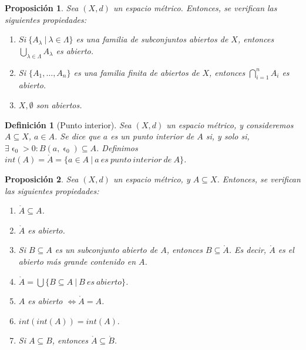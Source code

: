 \documentclass[11pt, a4paper, titlepage]{article}
\let\epsilon\upvarepsilon
\theoremstyle{theorem-style}
\newtheorem*{nprop}{Proposición}
\theoremstyle{definition-style}
\newtheorem*{ndef}{Definición}
\theoremstyle{remark-style}
\theoremstyle{example-style}
\newenvironment{nlist}
{\begin{enumerate}
\renewcommand\labelenumi{(\emph{\roman{enumi})}}}
{\end{enumerate}}
\begin{document}
\begin{nprop}
Sea $(X,d)$ un espacio métrico. Entonces, se verifican las siguientes propiedades:

\begin{nlist}
\item $Si\ \{A_\lambda \ | \ \lambda \in \Lambda \}$ es una familia de subconjuntos abiertos de $X$, entonces $\displaystyle \bigcup_{\lambda \in \Lambda} A_\lambda$ es abierto.

\item Si $\{A_1,\dots, A_n\}$ es una familia finita de abiertos de $X$, entonces $\displaystyle \bigcap_{i=1}^n A_i$ es abierto.

\item $X,\emptyset$ son abiertos.
\end{nlist}

\end{nprop}



\begin{ndef}[Punto interior]
Sea $(X,d)$ un espacio métrico, y consideremos $A\subseteq X$, $a\in A$. Se dice que $a$ \emph{es un punto interior de} $A$ si, y solo si, $\exists \epsilon_0 > 0: B(a,\epsilon_0)\subseteq A$.  Definimos $int(A) = \mathring{A} = \{ a\in A \ | \ a\ es\ punto\ interior\ de\ A\}$.
\end{ndef}



\begin{nprop}
Sea $(X,d)$ un espacio métrico, y $A\subseteq X$. Entonces, se verifican las siguientes propiedades:

\begin{nlist}
\item $\mathring{A} \subseteq A$.

\item $\mathring{A}$ es abierto.

\item Si $B\subseteq A$ es un subconjunto abierto de $A$, entonces $B \subseteq \mathring{A}$. Es decir, $\mathring{A}$ es el abierto más grande contenido en $A$.

\item $\displaystyle \mathring{A}  = \bigcup \{ B\subseteq A \ | \ B\ es\ abierto \}$.

\item $A$ es abierto $\iff \mathring{A} =A$.

\item $int(int(A)) = int(A).$

\item Si $A\subseteq B$, entonces $\mathring{A} \subseteq \mathring{B}$.
\end{nlist}

\end{nprop}
\end{document}

